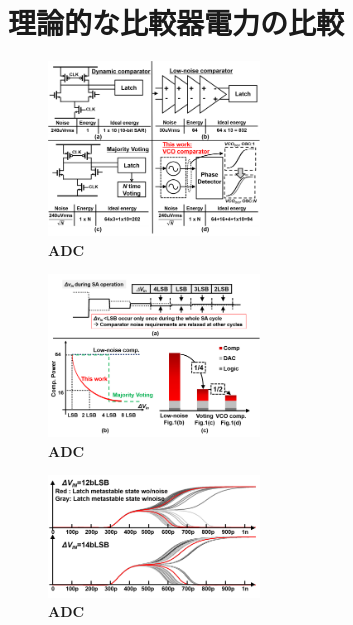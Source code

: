 \documentclass[letterpaper, 10 pt, conference]{ieeeconf}  %
\begin{document}
\section{理論的な比較器電力の比較}
\begin{figure}[ht!]
\centering
 \includegraphics[width=0.5\textwidth]{figs/fig1.png}
  \captionsetup{font=footnotesize}
  \caption{\textbf{ADC}}
  \label{fig1}
\end{figure}
\begin{figure}[ht!]
\centering
 \includegraphics[width=0.5\textwidth]{figs/fig2.png}
  \captionsetup{font=footnotesize}
  \caption{\textbf{ADC}}
  \label{fig2}
\end{figure}
\begin{figure}[ht!]
\centering
 \includegraphics[width=0.5\textwidth]{figs/conventional-strongarm.png}
  \captionsetup{font=footnotesize}
  \caption{\textbf{ADC}}
  \label{meta}
\end{figure}
\end{document}
